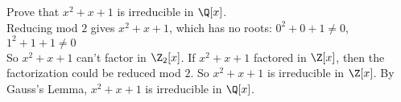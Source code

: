 \eg Prove that $x^2+x+1$ is irreducible in $\Q[x]$. \\
\soln Reducing mod $2$ gives $x^2+x+1$, which has no roots: $0^2+0+1\neq0$, $1^2+1+1\neq0$ \\
So $x^2+x+1$ can't factor in $\Z_2[x]$.  If $x^2+x+1$ factored in $\Z[x]$, then the factorization could be reduced mod $2$.  So $x^2+x+1$ is irreducible in $\Z[x]$.  By Gauss's Lemma, $x^2+x+1$ is irreducible in $\Q[x]$.
